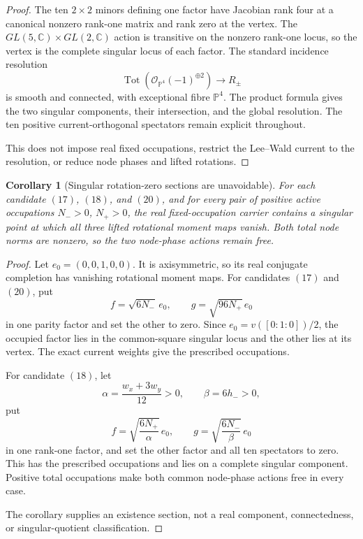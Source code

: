 \documentclass[11pt]{article}
\newtheorem{corollary}[theorem]{Corollary}
\theoremstyle{definition}
\theoremstyle{remark}
\begin{document}
\begin{proof}
The ten \(2\times2\) minors defining one factor have Jacobian rank four at a
canonical nonzero rank-one matrix and rank zero at the vertex.
The \(GL(5,\mathbb C)\times GL(2,\mathbb C)\) action is transitive on the
nonzero rank-one locus, so the vertex is the complete singular locus of
each factor.  The standard incidence resolution
\[
 \operatorname{Tot}\!\left(\mathcal O_{\mathbb P^4}(-1)^{\oplus2}\right)
 \longrightarrow R_\pm
\]
is smooth and connected, with exceptional fibre \(\mathbb P^4\).
The product formula gives the two singular components, their intersection,
and the global resolution.  The ten positive current-orthogonal spectators
remain explicit throughout.

This does not impose real fixed occupations, restrict the Lee--Wald current
to the resolution, or reduce node phases and lifted rotations.
\end{proof}

\begin{corollary}[Singular rotation-zero sections are unavoidable]
\label{cor:active-singular-rotation-zero-sections}
For each candidate \((17)\), \((18)\), and \((20)\), and for every pair of
positive active occupations \(N_->0\), \(N_+>0\), the real
fixed-occupation carrier contains a singular point at which all three lifted
rotational moment maps vanish.  Both total node norms are nonzero, so the two
node-phase actions remain free.
\end{corollary}

\begin{proof}
Let \(e_0=(0,0,1,0,0)\).  It is axisymmetric, so its real conjugate
completion has vanishing rotational moment maps.  For candidates \((17)\)
and \((20)\), put
\[
 f=\sqrt{6N_-}\,e_0,\qquad
 g=\sqrt{96N_+}\,e_0
\]
in one parity factor and set the other to zero.  Since
\(e_0=v([0:1:0])/2\), the occupied factor lies in the common-square
singular locus and the other lies at its vertex.  The exact current weights
give the prescribed occupations.

For candidate \((18)\), let
\[
 \alpha=\frac{w_x+3w_y}{12}>0,\qquad \beta=6h_->0,
\]
put
\[
 f=\sqrt{\frac{6N_+}{\alpha}}\,e_0,\qquad
 g=\sqrt{\frac{6N_-}{\beta}}\,e_0
\]
in one rank-one factor, and set the other factor and all ten spectators to
zero.  This has the prescribed occupations and lies on a complete singular
component.  Positive total occupations make both common node-phase actions
free in every case.

The corollary supplies an existence section, not a real component,
connectedness, or singular-quotient classification.
\end{proof}
\end{document}
